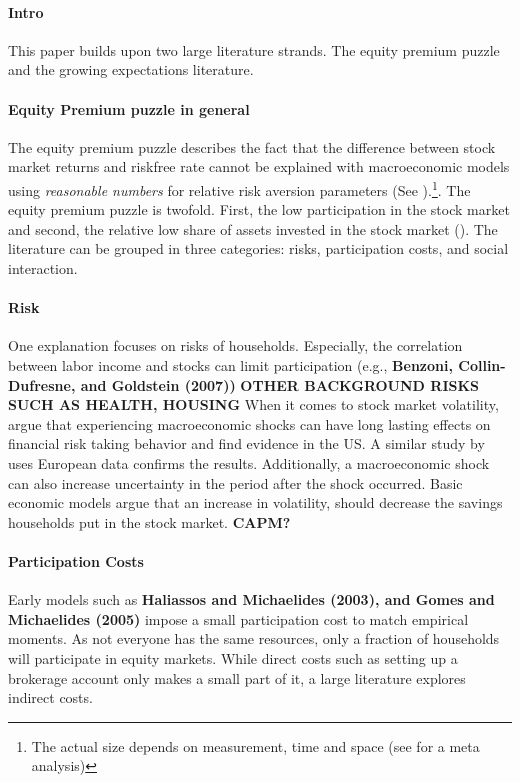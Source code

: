 \documentclass[ProjectABM]{subfiles}
\begin{document}
\paragraph{Intro}
This paper builds upon two large literature strands. The equity premium puzzle and the growing expectations literature.

\paragraph{Equity Premium puzzle in general}
The equity premium puzzle describes the fact that the difference between stock market returns and riskfree rate cannot be explained with macroeconomic models using \textit{reasonable numbers} for relative risk aversion parameters (See \cite{mehra_porescott_1985equity_premium, haliassos_bertraut_1995equity_premium, Gomes_et_al_2021}).\footnote{ The actual size depends on measurement, time and space (see\cite{vanEwijk_et_al_2012meta_equity_premium} for a meta analysis)}. The equity premium puzzle is twofold. First, the low participation in the stock market and second, the relative low share of assets invested in the stock market (\cite{campbell_2006household_finance}). 
The literature can be grouped in three categories: risks, participation costs, and social interaction.

\paragraph{Risk}
One explanation focuses on risks of households. Especially, the correlation between labor income and stocks can limit participation (e.g.,\textbf{ Benzoni, Collin-Dufresne, and Goldstein (2007))} \textbf{OTHER BACKGROUND RISKS SUCH AS HEALTH, HOUSING}
When it comes to stock market volatility, \cite{malmendier_2011} argue that experiencing macroeconomic shocks can have long lasting effects on financial risk taking behavior and find evidence in the US. A similar study by \cite{ampudia_ehrmann_2017macroeconomic} uses European data confirms the results. 
Additionally, a macroeconomic shock can also increase uncertainty in the period after the shock occurred. Basic economic models argue that an increase in volatility, should decrease the savings households put in the stock market. \textbf{CAPM?}

\paragraph{Participation Costs}
Early models such as \cite{vissing_2003} \textbf{Haliassos and Michaelides (2003), and Gomes and Michaelides (2005)} impose a small participation cost to match empirical moments. As not everyone has the same resources, only a fraction of households will participate in equity markets. While direct costs such as setting up a brokerage account only makes a small part of it, a large literature explores indirect costs.
\end{document}
